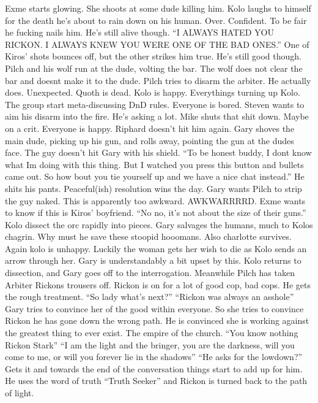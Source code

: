 Exme starts glowing. She shoots at some dude killing him.\medskip
Kolo laughs to himself for the death he’s about to rain down on his human. Over. Confident. To be fair he fucking nails him. He’s still alive though.\medskip
“I ALWAYS HATED YOU RICKON. I ALWAYS KNEW YOU WERE ONE OF THE BAD ONES.” One of Kiros’ shots bounces off, but the other strikes him true. He’s still good though.\medskip
Pilch and his wolf run at the dude, volting the bar. The wolf does not clear the bar and doesnt make it to the dude. Pilch tries to disarm the arbiter. He actually does. Unexpected.\medskip
Quoth is dead. Kolo is happy. Everythings turning up Kolo.\medskip
The group start meta-discussing DnD rules. Everyone is bored.\medskip
Steven wants to aim his disarm into the fire. He’s asking a lot. Mike shuts that shit down. Maybe on a crit. Everyone is happy.\medskip
Riphard doesn’t hit him again.\medskip
Gary shoves the main dude, picking up his gun, and rolls away, pointing the gun at the dudes face. The guy doesn’t hit Gary with his shield.\medskip
“To be honest buddy, I dont know what Im doing with this thing. But I watched you press this button and bullets came out. So how bout you tie yourself up and we have a nice chat instead.”\medskip
He shits his pants. Peaceful(ish) resolution wins the day.\medskip
Gary wants Pilch to strip the guy naked. This is apparently too awkward. AWKWARRRRD.\medskip
Exme wants to know if this is Kiros’ boyfriend.\medskip
“No no, it’s not about the size of their guns.”\medskip
Kolo dissect the orc rapidly into pieces.\medskip
Gary salvages the humans, much to Kolos chagrin. Why must he save these stoopid hooomans. Also charlotte survives. Again kolo is unhappy. Luckily the woman gets her wish to die as Kolo sends an arrow through her. Gary is understandably a bit upset by this. Kolo returns to dissection, and Gary goes off to the interrogation. Meanwhile Pilch has taken Arbiter Rickons trousers off. Rickon is on for a lot of good cop, bad cops. He gets the rough treatment.\medskip
“So lady what’s next?”\medskip
“Rickon was always an asshole”\medskip
Gary tries to convince her of the good within everyone. So she tries to convince Rickon he has gone down the wrong path. He is convinced she is working against the greatest thing to ever exist. The empire of the church.\medskip
“You know nothing Rickon Stark” “I am the light and the bringer, you are the darkness, will you come to me, or will you forever lie in the shadows”\medskip
“He asks for the lowdown?” Gets it and towards the end of the conversation things start to add up for him. He uses the word of truth “Truth Seeker” and Rickon is turned back to the path of light.\medskip
